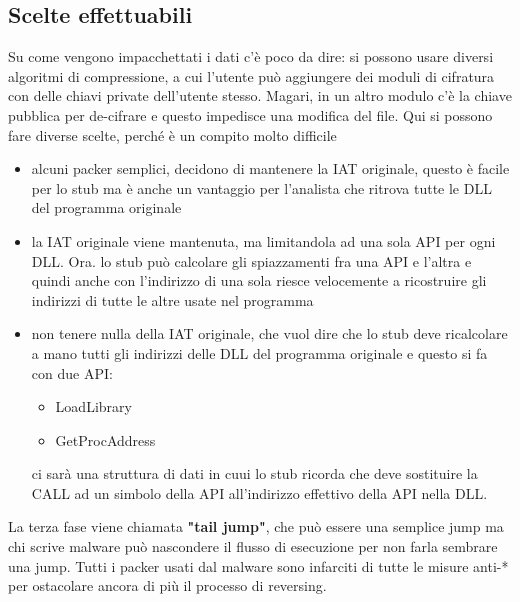 \documentclass[12pt, oneside]{extbook}
\begin{document}
\subsection{Scelte effettuabili}
Su come vengono impacchettati i dati c'è poco da dire: si possono usare diversi algoritmi di compressione, a cui l'utente può aggiungere dei moduli di cifratura con delle chiavi private dell'utente stesso. Magari, in un altro modulo c'è la chiave pubblica per de-cifrare e questo impedisce una modifica del file.
Qui si possono fare diverse scelte, perché è un compito molto difficile
\begin{itemize}
\item alcuni packer semplici, decidono di mantenere la IAT originale, questo è facile per lo stub ma è anche un vantaggio per l'analista che ritrova tutte le DLL del programma originale
\item la IAT originale viene mantenuta, ma limitandola ad una sola API per ogni DLL. Ora. lo stub può calcolare gli spiazzamenti fra una API e l'altra e quindi anche con l'indirizzo di una sola riesce velocemente a ricostruire gli indirizzi di tutte le altre usate nel programma
\item non tenere nulla della IAT originale, che vuol dire che lo stub deve ricalcolare a mano tutti gli indirizzi delle DLL del programma originale e questo si fa con due API:
\begin{itemize}
\item LoadLibrary
\item GetProcAddress
\end{itemize}
ci sarà una struttura di dati in cuui lo stub ricorda che deve sostituire la CALL ad un simbolo della API all'indirizzo effettivo della API nella DLL.
\end{itemize}
La terza fase viene chiamata \textbf{"tail jump"}, che può essere una semplice jump ma chi scrive malware può nascondere il flusso di esecuzione per non farla sembrare una jump. Tutti i packer usati dal malware sono infarciti di tutte le misure anti-* per ostacolare ancora di più il processo di reversing.
\end{document}
